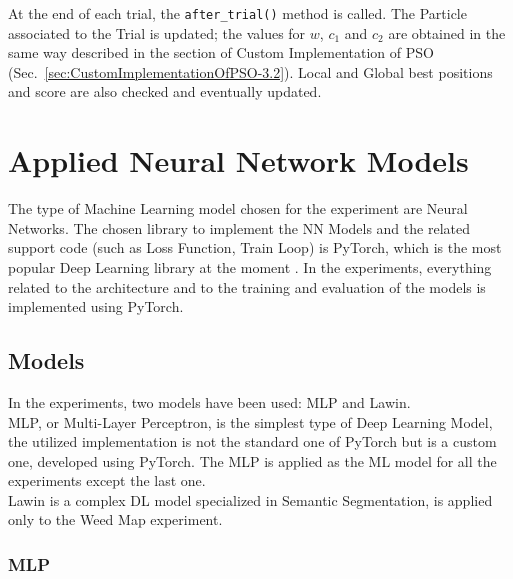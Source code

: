 At the end of each trial, the \texttt{after\_trial()} method is called.
The Particle associated to the Trial is updated; the values for $w$, $c_1$ and $c_2$ are obtained in the same way described in the section of Custom Implementation of PSO (Sec.~\ref{sec:CustomImplementationOfPSO-3.2}).
Local and Global best positions and score are also checked and eventually updated.

\section{Applied Neural Network Models}

The type of Machine Learning model chosen for the experiment are Neural Networks.
The chosen library to implement the NN Models and the related support code (such as Loss Function, Train Loop) is PyTorch, which is the most popular Deep Learning library at the moment \cite{PyTorch}.
In the experiments, everything related to the architecture and to the training and evaluation of the models is implemented using PyTorch.

\subsection{Models}

In the experiments, two models have been used: MLP and Lawin.
\\[0.3cm]MLP, or Multi-Layer Perceptron, is the simplest type of Deep Learning Model, the utilized implementation is not the standard one of PyTorch but is a custom one, developed using PyTorch. The MLP is applied as the ML model for all the experiments except the last one.
\\[0.3cm]Lawin is a complex DL model specialized in Semantic Segmentation, is applied only to the Weed Map experiment.

\subsubsection{MLP}

